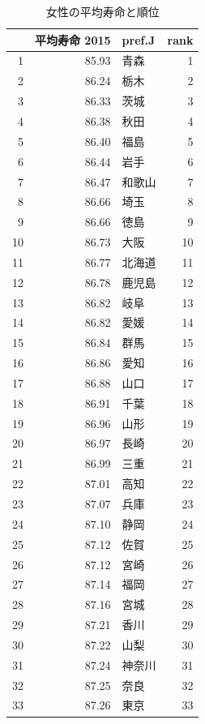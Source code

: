 \begin{table}[ht]
\caption{女性の平均寿命と順位}
\centering
\footnotesize
\begin{tabular}{rrlr}
  \hline
 & 平均寿命 2015 & pref.J & rank \\
  \hline
1 & 85.93 & 青森 &   1 \\
  2 & 86.24 & 栃木 &   2 \\
  3 & 86.33 & 茨城 &   3 \\
  4 & 86.38 & 秋田 &   4 \\
  5 & 86.40 & 福島 &   5 \\
  6 & 86.44 & 岩手 &   6 \\
  7 & 86.47 & 和歌山 &   7 \\
  8 & 86.66 & 埼玉 &   8 \\
  9 & 86.66 & 徳島 &   9 \\
  10 & 86.73 & 大阪 &  10 \\
  11 & 86.77 & 北海道 &  11 \\
  12 & 86.78 & 鹿児島 &  12 \\
  13 & 86.82 & 岐阜 &  13 \\
  14 & 86.82 & 愛媛 &  14 \\
  15 & 86.84 & 群馬 &  15 \\
  16 & 86.86 & 愛知 &  16 \\
  17 & 86.88 & 山口 &  17 \\
  18 & 86.91 & 千葉 &  18 \\
  19 & 86.96 & 山形 &  19 \\
  20 & 86.97 & 長崎 &  20 \\
  21 & 86.99 & 三重 &  21 \\
  22 & 87.01 & 高知 &  22 \\
  23 & 87.07 & 兵庫 &  23 \\
  24 & 87.10 & 静岡 &  24 \\
  25 & 87.12 & 佐賀 &  25 \\
  26 & 87.12 & 宮崎 &  26 \\
  27 & 87.14 & 福岡 &  27 \\
  28 & 87.16 & 宮城 &  28 \\
  29 & 87.21 & 香川 &  29 \\
  30 & 87.22 & 山梨 &  30 \\
  31 & 87.24 & 神奈川 &  31 \\
  32 & 87.25 & 奈良 &  32 \\
  33 & 87.26 & 東京 &  33 \\

\end{tabular}
\end{table}
